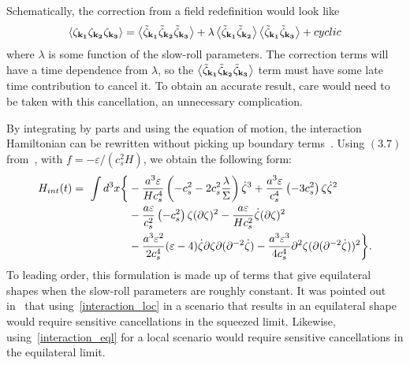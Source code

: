 Schematically, the correction from a field redefinition would look like
\begin{align}
{
\left< \zeta_{\bf{k_1}}\zeta_{\bf{k_2}}\zeta_{\bf{k_3}} \right>
    = \left< \tilde{\zeta}_{\bf{k_1}}\tilde{\zeta}_{\bf{k_2}}\tilde{\zeta}_{\bf{k_3}} \right>
    + \lambda \left< \tilde{\zeta}_{\bf{k_1}}\tilde{\zeta}_{\bf{k_2}} \right>\left< \tilde{\zeta}_{\bf{k_1}}\tilde{\zeta}_{\bf{k_3}} \right>
    + cyclic
}
\end{align}
where $\lambda$ is some function of the slow-roll parameters.
The correction terms will have a time dependence from $\lambda$,
so the $\left< \tilde{\zeta}_{\bf{k_1}}\tilde{\zeta}_{\bf{k_2}}\tilde{\zeta}_{\bf{k_3}} \right>$
term must have some late time contribution to cancel it.
To obtain an accurate result, care would need to be taken with this cancellation,
an unnecessary complication.

By integrating by parts and using the equation of motion,
the interaction Hamiltonian can be rewritten without
picking up boundary terms~\cite{rp_integ_by_parts}.
Using $(3.7)$ from~\cite{rp_integ_by_parts},
with $f=-\varepsilon/(c_s^2H)$,
we obtain the following form:
\begin{align}
    H_{int}(t)=\ \int d^3x\bigg\{& -\frac{a^3\varepsilon}{H c_s^4}\left(-c_s^{2}-2c_s^{2}\frac{\lambda}{\Sigma}\right)\dot{\zeta}^3
		+ \frac{a^3\varepsilon}{c_s^{4}}\left(-3c_s^2\right) \zeta\dot{\zeta}^2\nonumber\\
		&- \frac{a\varepsilon}{c_s^{2}}\left(-c_s^2\right) \zeta(\partial\zeta)^2
        - \frac{a\varepsilon}{Hc_s^2}\dot{\zeta}(\partial\zeta)^2\nonumber\\
        &- \frac{a^3\varepsilon^2}{2c_s^{4}}(\varepsilon-4)\dot{\zeta}\partial\zeta\partial(\partial^{-2}\dot{\zeta})
        - \frac{a^3\varepsilon^3}{4c_s^4}\partial^2\zeta(\partial(\partial^{-2}\dot{\zeta}))^2\bigg\}.\label{interaction_eql}
\end{align}
To leading order, this formulation is made up of terms that
give equilateral shapes when the slow-roll parameters are roughly constant.
It was pointed out in~\cite{Funakoshi} that
using~\eqref{interaction_loc} in a scenario that results in an equilateral shape
would require sensitive cancellations in the squeezed limit.
Likewise, using~\eqref{interaction_eql} for a local scenario
would require sensitive cancellations in the equilateral limit.

